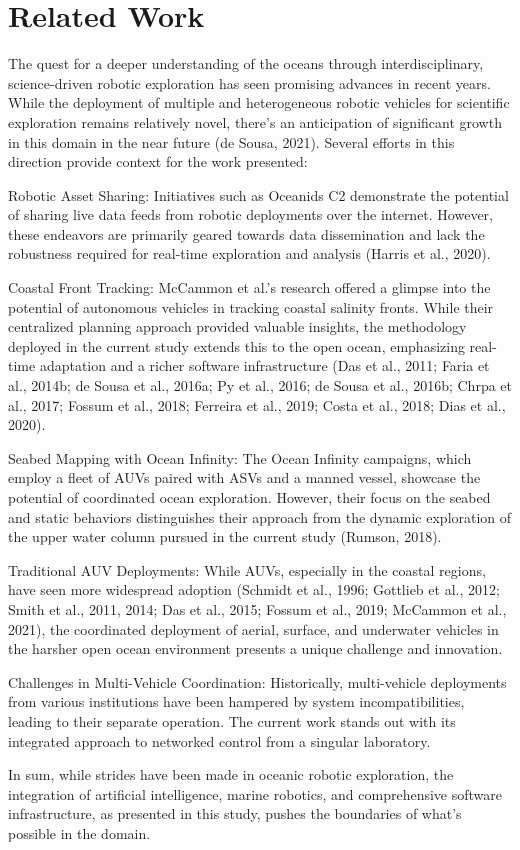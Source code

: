 \section{Related Work}
\label{sec:related}

The quest for a deeper understanding of the oceans through interdisciplinary, science-driven robotic exploration has seen promising advances in recent years. While the deployment of multiple and heterogeneous robotic vehicles for scientific exploration remains relatively novel, there's an anticipation of significant growth in this domain in the near future (de Sousa, 2021). Several efforts in this direction provide context for the work presented:

Robotic Asset Sharing: Initiatives such as Oceanids C2 demonstrate the potential of sharing live data feeds from robotic deployments over the internet. However, these endeavors are primarily geared towards data dissemination and lack the robustness required for real-time exploration and analysis (Harris et al., 2020).

Coastal Front Tracking: McCammon et al.'s research offered a glimpse into the potential of autonomous vehicles in tracking coastal salinity fronts. While their centralized planning approach provided valuable insights, the methodology deployed in the current study extends this to the open ocean, emphasizing real-time adaptation and a richer software infrastructure (Das et al., 2011; Faria et al., 2014b; de Sousa et al., 2016a; Py et al., 2016; de Sousa et al., 2016b; Chrpa et al., 2017; Fossum et al., 2018; Ferreira et al., 2019; Costa et al., 2018; Dias et al., 2020).

Seabed Mapping with Ocean Infinity: The Ocean Infinity campaigns, which employ a fleet of AUVs paired with ASVs and a manned vessel, showcase the potential of coordinated ocean exploration. However, their focus on the seabed and static behaviors distinguishes their approach from the dynamic exploration of the upper water column pursued in the current study (Rumson, 2018).

Traditional AUV Deployments: While AUVs, especially in the coastal regions, have seen more widespread adoption (Schmidt et al., 1996; Gottlieb et al., 2012; Smith et al., 2011, 2014; Das et al., 2015; Fossum et al., 2019; McCammon et al., 2021), the coordinated deployment of aerial, surface, and underwater vehicles in the harsher open ocean environment presents a unique challenge and innovation.

Challenges in Multi-Vehicle Coordination: Historically, multi-vehicle deployments from various institutions have been hampered by system incompatibilities, leading to their separate operation. The current work stands out with its integrated approach to networked control from a singular laboratory.

In sum, while strides have been made in oceanic robotic exploration, the integration of artificial intelligence, marine robotics, and comprehensive software infrastructure, as presented in this study, pushes the boundaries of what's possible in the domain.

